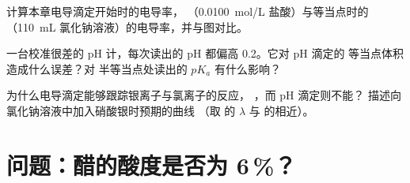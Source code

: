 \begin{exercise}[$\star\star\star$]\label{exo:g12:ph-conductivity-titrations:13}
计算本章电导滴定开始时的电导率，
（\qty{0.0100}{mol/L} 盐酸）与等当点时的
（\qty{110}{mL} 氯化钠溶液）的电导率，并与图对比。
\end{exercise}

\begin{exercise}[$\star\star\star$]\label{exo:g12:ph-conductivity-titrations:14}
一台校准很差的 pH 计，每次读出的 pH 都偏高 0.2。它对 pH 滴定的
等当点体积造成什么误差？对
半等当点处读出的 $pK_a$ 有什么影响？
\end{exercise}

\begin{exercise}[$\star\star\star$]\label{exo:g12:ph-conductivity-titrations:15}
为什么电导滴定能够跟踪银离子与氯离子的反应，
，而 pH 滴定则不能？
描述向氯化钠溶液中加入硝酸银时预期的曲线
（取  的 $\lambda$ 与
 的相近）。
\end{exercise}

\section{问题：醋的酸度是否为 6\,\%？}

